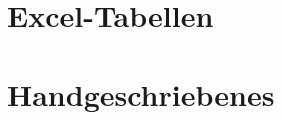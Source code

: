 \begin{appendices}
    \section{Excel-Tabellen}
    
    

    \section{Handgeschriebenes}
\end{appendices}


